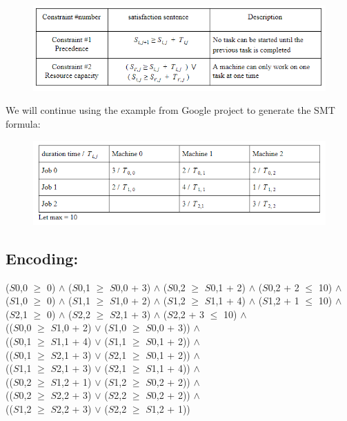 \begin{figure}[H]
\centering
\includegraphics[width=6in]{img/2.PNG}

\end{figure}
We will continue using the example from Google project to generate the SMT formula:

\begin{figure}[H]
\centering
\includegraphics[width=6in]{img/3.PNG}

\end{figure}

\subsection*{Encoding:}
($S${\scriptsize0,0} $\geq$ 0) $\wedge$ ($S${\scriptsize0,1} $\geq$ $S${\scriptsize0,0} + 3) $\wedge$ ($S${\scriptsize0,2} $\geq$ $S${\scriptsize0,1} + 2) $\wedge$ ($S${\scriptsize0,2} + 2 $\leq$ 10) $\wedge$ \\
($S${\scriptsize1,0} $\geq$ 0) $\wedge$ ($S${\scriptsize1,1} $\geq$ $S${\scriptsize1,0} + 2) $\wedge$ ($S${\scriptsize1,2} $\geq$ $S${\scriptsize1,1} + 4) $\wedge$ ($S${\scriptsize1,2} + 1 $\leq$ 10) $\wedge$ \\
($S${\scriptsize2,1} $\geq$ 0) $\wedge$ ($S${\scriptsize2,2} $\geq$ $S${\scriptsize2,1} + 3)  $\wedge$ ($S${\scriptsize2,2} + 3 $\leq$ 10) $\wedge$ \\
(($S${\scriptsize0,0} $\geq$ $S${\scriptsize1,0} + 2) $\vee$ ($S${\scriptsize1,0} $\geq$ $S${\scriptsize0,0} + 3)) $\wedge$ \\
(($S${\scriptsize0,1} $\geq$ $S${\scriptsize1,1} + 4) $\vee$ ($S${\scriptsize1,1} $\geq$ $S${\scriptsize0,1} + 2)) $\wedge$ \\
(($S${\scriptsize0,1} $\geq$ $S${\scriptsize2,1} + 3) $\vee$ ($S${\scriptsize2,1} $\geq$ $S${\scriptsize0,1} + 2)) $\wedge$ \\
(($S${\scriptsize1,1} $\geq$ $S${\scriptsize2,1} + 3) $\vee$ ($S${\scriptsize2,1} $\geq$ $S${\scriptsize1,1} + 4)) $\wedge$ \\
(($S${\scriptsize0,2} $\geq$ $S${\scriptsize1,2} + 1) $\vee$ ($S${\scriptsize1,2} $\geq$ $S${\scriptsize0,2} + 2)) $\wedge$ \\
(($S${\scriptsize0,2} $\geq$ $S${\scriptsize2,2} + 3) $\vee$ ($S${\scriptsize2,2} $\geq$ $S${\scriptsize0,2} + 2)) $\wedge$ \\
(($S${\scriptsize1,2} $\geq$ $S${\scriptsize2,2} + 3) $\vee$ ($S${\scriptsize2,2} $\geq$ $S${\scriptsize1,2} + 1)) 
